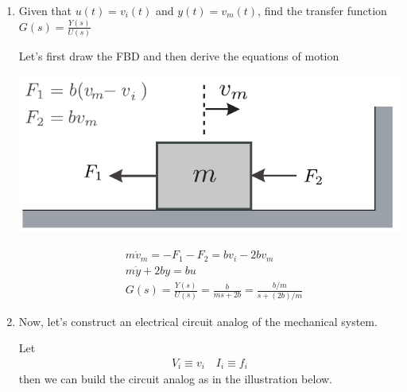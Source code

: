 \documentclass[twoside]{article}
\begin{document}
\begin{enumerate}

\item Given that $u(t) = v_i(t)$ and $y(t) = v_m(t)$, find the transfer
function $G(s) = \frac{Y(s)}{U(s)}$

\vspace{6pt}

Let's first draw the FBD and then derive the equations
of motion

  \begin{minipage}[h]{0.5\linewidth}
    \begin{center}
      \includegraphics[width=1\textwidth]{example_sol}
    \end{center}
  \end{minipage}
  \begin{minipage}[h]{0.5\linewidth}
    \begin{center}
 	\begin{align*}
	&m \dot{v}_m = -F_1 - F_2 = b v_i - 2 b v_m 
	\\
        &m \dot{y}  + 2 b y = b u
         \\
         &G(s) =  \frac{Y(s)}{U(s)} = \frac{b}{m s + 2 b} =
           \frac{b/m}{s + (2 b)/m} 
		\end{align*}
    \end{center}
   \end{minipage}

\item Now, let's construct an electrical circuit analog of the mechanical system.

Let 
%
\begin{align*}
	V_i \equiv v_i
	\quad 
	I_i \equiv f_i
\end{align*}
%
then we can build the circuit analog as in the illustration below. 


\end{enumerate}
\end{document}
